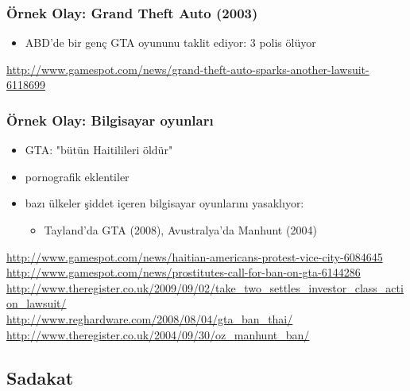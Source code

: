 \documentclass[dvipsnames]{beamer}
\theoremstyle{definition}
\theoremstyle{example}
\theoremstyle{plain}
\begin{document}
\begin{frame}
  \frametitle{Örnek Olay: Grand Theft Auto (2003)}

  \begin{center}
  \end{center}

  \begin{itemize}
    \item ABD'de bir genç GTA oyununu taklit ediyor: 3 polis ölüyor
  \end{itemize}

  \medskip
  \tiny{\url{http://www.gamespot.com/news/grand-theft-auto-sparks-another-lawsuit-6118699}}
\end{frame}

\begin{frame}
  \frametitle{Örnek Olay: Bilgisayar oyunları}

  \begin{itemize}
    \item GTA: "bütün Haitilileri öldür"
    \item pornografik eklentiler

    \bigskip
    \item bazı ülkeler şiddet içeren bilgisayar oyunlarını yasaklıyor:
    \begin{itemize}
      \item Tayland'da GTA (2008), Avustralya'da Manhunt (2004)
    \end{itemize}
  \end{itemize}

  \medskip
  \tiny{\url{http://www.gamespot.com/news/haitian-americans-protest-vice-city-6084645}}\\
  \tiny{\url{http://www.gamespot.com/news/prostitutes-call-for-ban-on-gta-6144286}}\\
  \tiny{\url{http://www.theregister.co.uk/2009/09/02/take_two_settles_investor_class_action_lawsuit/}}\\
  \tiny{\url{http://www.reghardware.com/2008/08/04/gta_ban_thai/}}\\
  \tiny{\url{http://www.theregister.co.uk/2004/09/30/oz_manhunt_ban/}}\\
\end{frame}

\subsection{Sadakat}
\end{document}
